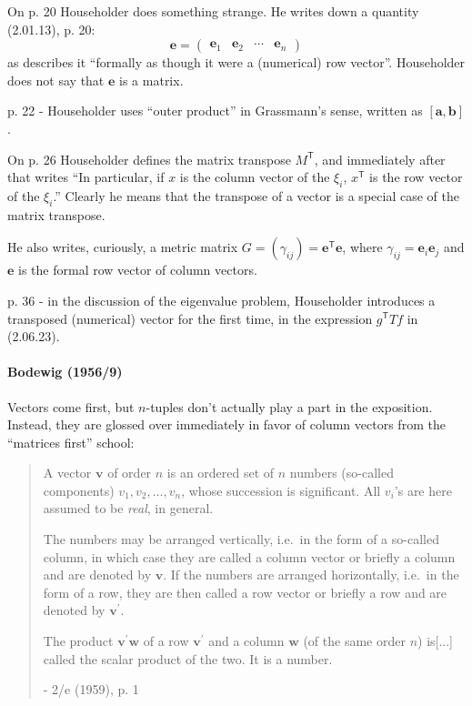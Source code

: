 On p. 20 Householder does something strange. He writes down a quantity (2.01.13), p. 20:
\[
\mathbf e = \begin{pmatrix}\mathbf e_1 & \mathbf e_2 & \cdots & \mathbf e_n\end{pmatrix}
\]
as describes it ``formally as though it were a (numerical) row vector''.
Householder does not say that $\mathbf e$ is a matrix.

p. 22 - Householder uses ``outer product'' in Grassmann's sense, written as
$[\mathbf a, \mathbf b]$.

On p. 26 Householder defines the matrix transpose $M^{\mathsf T}$, and immediately
after that writes ``In particular, if $x$ is the column vector of the $\xi_i$,
$x^{\mathsf T}$ is the row vector of the $\xi_i$.'' Clearly he means that the
transpose of a vector is a special case of the matrix transpose.

He also writes, curiously, a metric matrix $G = (\gamma_{ij}) = \mathbf e^{\mathsf T} \mathbf e$,
where $\gamma_{ij} = \mathbf e_i \mathbf e_j$ and $\mathbf e$ is the formal row
vector of column vectors.

p. 36 - in the discussion of the eigenvalue problem, Householder introduces a
transposed (numerical) vector for the first time, in the expression $g^{\mathsf
T}Tf$ in (2.06.23).


\paragraph{Bodewig (1956/9)~\cite{Bodewig1956}}

Vectors come first, but $n$-tuples don't actually play a part in the exposition.
Instead, they are glossed over immediately in favor of column vectors from the
``matrices first'' school:

\begin{quote}
A vector $\mathbf v$ of order $n$ is an ordered set of $n$ numbers (so-called
components) $v_1, v_2, \dots, v_n$, whose succession is significant. All $v_i$'s are here
assumed to be \textit{real}, in general.

The numbers may be arranged vertically, i.e.\ in the form of a so-called
column, in which case they are called a column vector or briefly a
column and are denoted by $\mathbf v$. If the numbers are arranged horizontally,
i.e.\ in the form of a row, they are then called a row vector or briefly a
row and are denoted by $\mathbf v^\prime$.

The product $\mathbf v^\prime \mathbf w$ of a row $\mathbf v^\prime$ and a column
$\mathbf w$ (of the same order $n$) is[...] called the scalar product of the two. It is a number.

- 2/e (1959), p. 1
\end{quote}

